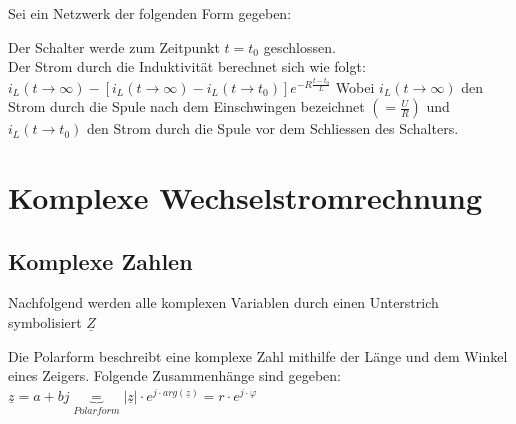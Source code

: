 \beginip
	Sei ein Netzwerk der folgenden Form gegeben:
	\begin{center}
	\end{center}
	Der Schalter werde zum Zeitpunkt $t = t_0$ geschlossen. \\
	Der Strom durch die Induktivität berechnet sich wie folgt:\\
	\formulaBegin
	$\displaystyle i_L(t \rightarrow \infty) - [i_L(t \rightarrow \infty) - i_L(t \rightarrow t_0)]e^{-R \frac{t -t_0}{L}}$
	\formulaEnd
	Wobei $i_L(t \rightarrow \infty)$ den Strom durch die Spule nach dem Einschwingen bezeichnet $(= \frac{U}{R})$ und $i_L(t \rightarrow t_0)$ den Strom durch die Spule vor dem Schliessen des Schalters.
\iend

\newpage

\section{Komplexe Wechselstromrechnung}


\subsection{Komplexe Zahlen}

Nachfolgend werden alle komplexen Variablen durch einen Unterstrich symbolisiert $\underline{Z}$ \\

\beginip

Die Polarform beschreibt eine komplexe Zahl mithilfe der Länge und dem Winkel eines Zeigers.
Folgende Zusammenhänge sind gegeben:
\formulaBegin
$\displaystyle \underline{z} = a + b j \underbrace{=}_{Polarform} |\underline{z}| \cdot e^{j \cdot arg(\underline{z})} = r\cdot e^{j\cdot \varphi }$
\formulaEnd
\begin{center}
\end{center}
\iend

